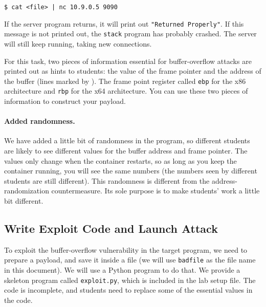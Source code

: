 \begin{lstlisting}
$ cat <file> | nc 10.9.0.5 9090
\end{lstlisting}

If the server program returns, it will print out \texttt{"Returned Properly"}.
If this message is not printed out, the \texttt{stack} program has probably crashed. 
The server will still keep running, taking new connections.  

For this task, two pieces of information essential for buffer-overflow 
attacks are printed out as hints to students: 
the value of the frame pointer and the address
of the buffer (lines marked by ). The frame point register 
called \texttt{ebp} for the x86 architecture and \texttt{rbp} for the x64 architecture.
You can use these two pieces of information to construct 
your payload. 


\paragraph{Added randomness.} We have added a little bit of randomness
in the program, so different students are likely to see different values
for the buffer address and frame pointer. The values only change 
when the container restarts, so as long as you keep the 
container running, you will see the same numbers (the numbers 
seen by different students are still different). This randomness
is different from the address-randomization countermeasure. Its sole
purpose is to make students' work a little bit different. 


\subsection{Write Exploit Code and Launch Attack} 

To exploit the buffer-overflow vulnerability in the target program,
we need to prepare a payload, and save it inside a file (we will use 
\texttt{badfile} as the file name in this document). 
We will use a Python program to do that.
We provide a skeleton program called \texttt{exploit.py}, which
is included in the lab setup file. 
The code is incomplete, and students need to replace some of the essential 
values in the code. 


\newcommand{\needtochange}{\ding{73} Need to change \ding{73}}


